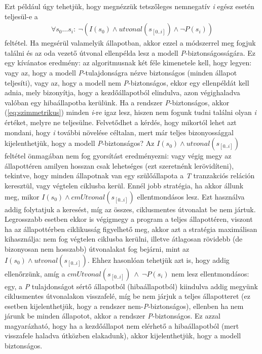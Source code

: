 Ezt például úgy tehetjük, hogy megnézzük tetszőleges nemnegatív \emph{i} egész esetén teljesül-e a
\begin{align}
	\label{eq:szimmetrikus}
	\forall s_{0} \dots s_{i}:~\neg(I(s_{0}) \wedge \mathit{utvonal}(s_{[0..i]}) \wedge \neg P(s_{i}))
\end{align}
feltétel. Ha megsérül valamelyik állapotban, akkor ezzel a módszerrel meg fogjuk találni és az oda vezető útvonal ellenpélda lesz a modell \emph{P}-biztonságosságára. Ez egy kívánatos eredmény: az algoritmusnak két féle kimenetele kell, hogy legyen: vagy az, hogy a modell \emph{P}-tulajdonságra nézve biztonságos (minden állapot teljesíti), vagy az, hogy a modell nem \emph{P}-biztonságos, ekkor egy ellenpéldát kell adnia, mely bizonyítja, hogy a  kezdőállapotból elindulva, azon végighaladva valóban egy hibaállapotba kerülünk.
\newline
\newline
Ha a rendszer \emph{P}-biztonságos, akkor (\ref{eq:szimmetrikus}) minden \emph{i}-re igaz lesz, hiszen nem fogunk tudni találni olyan \emph{i} értéket, melyre ne teljesülne. Felvetődhet a kérdés, hogy mikortól lehet azt mondani, hogy \emph{i} további növelése céltalan, mert már teljes bizonyossággal kijelenthetjük, hogy a modell \emph{P}-biztonságos? Az $I(s_{0}) \wedge \mathit{utvonal}(s_{[0..i]})$ feltétel önmagában nem fog gyorsítást eredményezni: vagy végig megy az állapottéren amilyen hosszan csak lehetséges (ezt szeretnénk lerövidíteni), tekintve, hogy minden állapotnak van egy szülőállapota a \emph{T} tranzakciós reláción keresztül, vagy végtelen ciklusba kerül.
\newline
\newline
Ennél jobb stratégia, ha akkor állunk meg, mikor $I(s_{0}) \wedge  \mathit{cmUtvonal}(s_{[0..i]})$ ellentmondásos lesz. Ezt használva addig folytatjuk a keresést, míg az összes, ciklusmentes útvonalat be nem jártuk. Legrosszabb esetben ekkor is végigmegy a program a teljes állapottéren, viszont ha az állapottérben ciklikusság figyelhető meg, akkor azt a stratégia maximálisan kihasználja: nem fog végtelen ciklusba kerülni, illetve átlagosan rövidebb (de bizonyosan nem hosszabb) útvonalakat fog bejárni, mint az $I(s_{0}) \wedge \mathit{utvonal}(s_{[0..i]})$.
\newline
\newline
Ehhez hasonlóan tehetjük azt is, hogy addig ellenőrzünk, amíg a $\mathit{cmUtvonal}(s_{[0..i]})~\wedge~\neg P(s_{i})$ nem lesz ellentmondásos: egy, a \emph{P} tulajdonságot sértő állapotból (hibaállapotból) kiindulva addig megyünk ciklusmentes útvonalakon visszafelé, míg be nem járjuk a teljes állapotteret (ez esetben kijelenthetjük, hogy a rendszer nem-\emph{P}-biztonságos), ellenben ha nem járunk be minden állapotot, akkor a rendszer \emph{P}-biztonságos. Ez azzal magyarázható, hogy ha a kezdőállapot nem elérhető a hibaállapotból (mert visszafele haladva útközben elakadunk), akkor kijelenthetjük, hogy a modell biztonságos.
